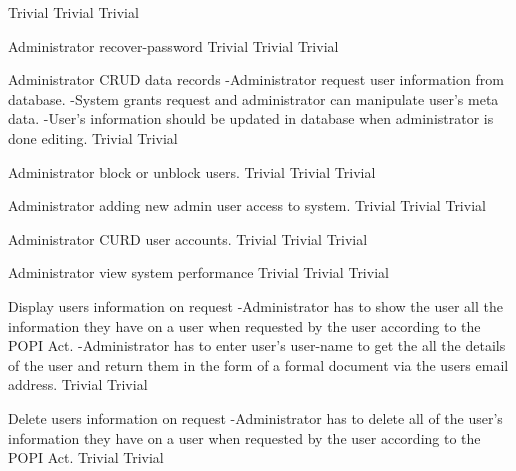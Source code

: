   	{Trivial}
	 	{Trivial}
  	{Trivial}
	  
\FuncReq
    {Administrator recover-password}		
		{Trivial}
  	{Trivial}
		{Trivial}
 
\FuncReq
    {Administrator CRUD data records}
		{-Administrator request user information from database.
		-System grants request and administrator can manipulate user's meta data.
		-User's information should be updated in database when administrator is done editing.}
		{Trivial}
 		{Trivial}

\FuncReq
    {Administrator block or unblock users.}   
    {Trivial}
    {Trivial}
    {Trivial}
		
\FuncReq
    {Administrator adding new admin user access to system.}
    {Trivial}
    {Trivial}
    {Trivial}
		
\FuncReq
    {Administrator CURD user accounts.}
    {Trivial}
    {Trivial}
 	 	{Trivial}

\FuncReq
    {Administrator view system performance}
    {Trivial}
    {Trivial}
    {Trivial}

\FuncReq
    {Display users information on request}
    {-Administrator has to show the user all the information they have on a user when requested by the user according to the POPI Act.
  	-Administrator has to enter user's user-name to get the all the details of the user and return them in the form of a formal document via the users email address.
    }
	{Trivial}
	{Trivial}

\FuncReq
  {Delete users information on request}
	{-Administrator has to delete all of the user's information they have on a user when requested by the user according to the POPI Act.}
	{Trivial}
	{Trivial}

